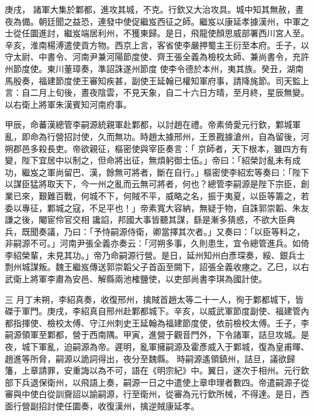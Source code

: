 \begin{pinyinscope}
 庚戌，
 諸軍大集於鄴都，進攻其城，不克。行欽又大治攻具。城中知其無赦，晝夜為備。朝廷聞之益恐，連發中使促繼岌西征之師。繼岌以康延孝據漢州，中軍之士從任圜進討，繼岌端居利州，不獲東歸。是日，飛龍使顏思威部署西川宮人至。辛亥，淮南楊溥遣使貢方物。西京上言，客省使李嚴押蜀主王衍至本府。壬子，以守太尉、中書令、河南尹兼河陽節度使、齊王張全義為檢校太師、兼尚書令，充許州節度使。東川董璋奏，準詔誅遂州節度
 使李令德於本州，夷其族。癸丑，湖南馬殷奏，福建節度使王審知疾甚，副使王延翰已權知軍府事，請降旄節。司天監上言：自二月上旬後，晝夜陰雲，不見天象，自二十六日方晴，至月終，星辰無變。以右衛上將軍朱漢賓知河南府事。



 甲辰，命蕃漢總管李嗣源統親軍赴鄴都，以討趙在禮。帝素倚愛元行欽，鄴城軍亂，即命為行營招討使，久而無功。時趙太據邢州，王景戡據滄州，自為留後，河朔郡邑多殺長吏。帝欲親征，樞密使與宰臣奏言：「
 京師者，天下根本，雖四方有變，陛下宜居中以制之，但命將出征，無煩躬御士伍。」帝曰：「紹榮討亂未有成功，繼岌之軍尚留巴、漢，餘無可將者，斷在自行。」樞密使李紹宏等奏曰：「陛下以謀臣猛將取天下，今一州之亂而云無可將者，何也？總管李嗣源是陛下宗臣，創業已來，艱難百戰，何城不下，何賊不平，威略之名，振于夷夏，以臣等籌之，若委以專征，鄴城之寇，不足平也！」帝素寬大容納，無疑于物，自誅郭崇韜、朱友謙之後，閹宦伶官交相
 讒諂，邦國大事皆聽其謀，繇是漸多猜惑，不欲大臣典兵，既聞奏議，乃曰：「予恃嗣源侍衛，卿當擇其次者。」又奏曰：「以臣等料之，非嗣源不可。」河南尹張全義亦奏云：「河朔多事，久則患生，宜令總管進兵。如倚李紹榮輩，未見其功。」帝乃命嗣源行營。是日，延州知州白彥琛奏，綏、銀兵士剽州城謀叛。魏王繼岌傳送郭崇韜父子首函至闕下，詔張全義收瘞之。乙巳，以右武衛上將軍李肅為安邑、解縣兩池榷鹽使，以吏部尚書李琪為國計使。



 三
 月丁未朔，李紹真奏，收復邢州，擒賊首趙太等二十一人，徇于鄴都城下，皆磔于軍門。庚戌，李紹真自邢州赴鄴都城下。辛亥，以威武軍節度副使、福建管內都指揮使、檢校太傅、守江州刺史王延翰為福建節度使，依前檢校太傅。壬子，李嗣源領軍至鄴都，營于西南隅。甲寅，進營于觀音門外，下令諸軍，詰旦攻城。是夜，城下軍亂，迫嗣源為帝。遲明，亂軍擁嗣源及霍彥威入于鄴城，復為皇甫暉、趙進等所脅，嗣源以詭詞得出，夜分至魏縣。
 時嗣源遙領鎮州，詰旦，議欲歸籓，上章請罪，安重誨以為不可，語在《明宗紀》中。翼日，遂次于相州。元行欽部下兵退保衛州，以飛語上奏，嗣源一日之中遣使上章申理者數四。帝遣嗣源子從審與中使白從訓齎詔以諭嗣源，行至衛州，從審為元行欽所械，不得達。是日，西面行營副招討使任圜奏，收復漢州，擒逆賊康延孝。




\end{pinyinscope}

